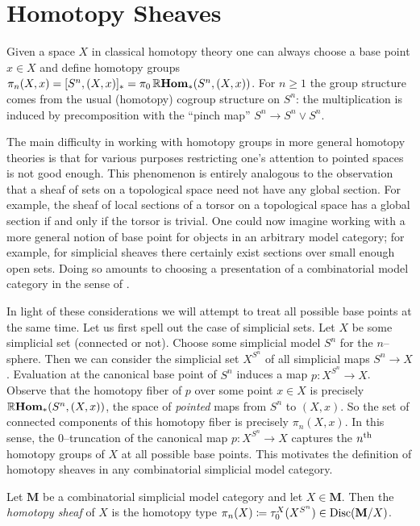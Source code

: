 \documentclass[main.tex]{subfiles}
\begin{document}
\section{Homotopy Sheaves}

Given a space \(X\) in classical homotopy theory one can always choose a base
point \(x\in X\) and define homotopy groups \(\pi_{n}(X,x) = [S^{n}, (X,x)]_{*}
= \pi_{0}\operatorname{\mathbb{R}\textnormal{\bfseries Hom}}_{*}(S^{n}, (X,x))\). For \(n\geq 1\) the group structure comes
from the usual (homotopy) cogroup structure on \(S^{n}\): the multiplication is
induced by precomposition with the \enquote{pinch map} \(S^{n}\to S^{n}\vee
S^{n}\).

The main difficulty in working with homotopy groups in more general homotopy
theories is that for various purposes restricting one's attention to pointed
spaces is not good enough. This phenomenon is entirely analogous to the
observation that a sheaf of sets on a topological space need not have any global
section. For example, the sheaf of local sections of a torsor on a topological
space has a global section if and only if the torsor is trivial. One could now
imagine working with a more general notion of base point for objects in an
arbitrary model category; for example, for simplicial sheaves there certainly
exist sections over small enough open sets. Doing so amounts to choosing a
presentation of a combinatorial model category in the sense of \cite{mr1870516}.

In light of these considerations we will attempt to treat all possible base
points at the same time. Let us first spell out the case of simplicial sets. Let
\(X\) be some simplicial set (connected or not). Choose some simplicial model
\(S^{n}\) for the \(n\)--sphere. Then we can consider the simplicial set
\(X^{S^{n}}\) of all simplicial maps \(S^{n}\to X\). Evaluation at the canonical
base point of \(S^{n}\) induces a map \(p\colon X^{S^{n}}\to X\). Observe that
the homotopy fiber of \(p\) over some point \(x\in X\) is precisely
\(\operatorname{\mathbb{R}\textnormal{\bfseries Hom}}_{*}(S^{n}, (X,x))\), the space of \emph{pointed} maps from \(S^{n}\) to
\((X,x)\). So the set of connected components of this homotopy fiber is
precisely \(\pi_{n}(X,x)\). In this sense, the \(0\)--truncation of the
canonical map \(p\colon X^{S^{n}}\to X\) captures the \(n\textsuperscript{th}\)
homotopy groups of \(X\) at all possible base points. This motivates the
definition of homotopy sheaves in any combinatorial simplicial model category.

\begin{definition}
  Let \(\mathbf M\) be a combinatorial simplicial model category and let
  \(X\in\mathbf M\). Then the \emph{ homotopy sheaf} of \(X\) is the
  homotopy type \(\pi_{n}(X)\coloneqq\tau_{0}^{X}(X^{S^{n}})\in\operatorname{\textnormal{Disc}}(\mathbf
  M/X)\).
\end{definition}
\end{document}
